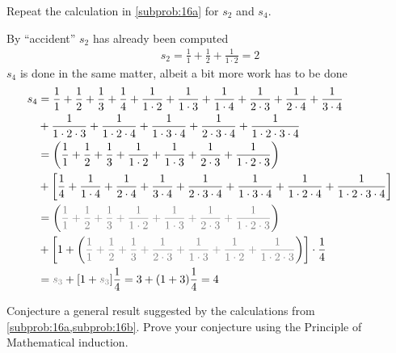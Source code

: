 \documentclass[a4paper, english, 12pt]{article} %
\begin{document}
\begin{subproblem}
    \label{subprob:16b}
  Repeat the calculation in \cref{subprob:16a} for $s_2$ and $s_4$.
\end{subproblem}

\begin{answer}
  By ``accident'' $s_2$ has already been computed
  \begin{align*}
    s_2 = \frac{1}{1} + \frac{1}{2} + \frac{1}{1 \cdot 2} = 2
  \end{align*}
  $s_4$ is done in the same matter, albeit a bit more work has to be done
  \begin{align*}
        s_4
    & = \frac{1}{1} + \frac{1}{2} + \frac{1}{3} + \frac{1}{4}
      + \frac{1}{1 \cdot 2} + \frac{1}{1 \cdot 3} + \frac{1}{1 \cdot 4} 
      + \frac{1}{2 \cdot 3} + \frac{1}{2 \cdot 4} + \frac{1}{3 \cdot 4} \\
    & + \frac{1}{1 \cdot 2 \cdot 3} + \frac{1}{1 \cdot 2 \cdot 4} + \frac{1}{1 \cdot 3 \cdot 4}
    + \frac{1}{2 \cdot 3 \cdot 4} + \frac{1}{1\cdot 2 \cdot 3 \cdot 4} \\
    & = \left(   \frac{1}{1} + \frac{1}{2} + \frac{1}{3}
      + \frac{1}{1\cdot 2} + \frac{1}{ 1 \cdot 3} + \frac{1}{2 \cdot 3} + \frac{1}{1 \cdot 2 \cdot 3} \right)\\
    & + \left[ \frac{1}{4}
      + \frac{1}{1\cdot 4} + \frac{1}{2 \cdot 4} + \frac{1}{3 \cdot 4} + \frac{1}{2 \cdot 3 \cdot 4} + \frac{1}{1 \cdot 3 \cdot 4} + \frac{1}{1 \cdot 2 \cdot 4} + \frac{1}{1 \cdot 2 \cdot 3 \cdot 4}\right] \\
    & = \left(   \textcolor{gray}{\frac{1}{1} + \frac{1}{2} + \frac{1}{3}
      + \frac{1}{1\cdot 2} + \frac{1}{ 1 \cdot 3} + \frac{1}{2 \cdot 3} + \frac{1}{1 \cdot 2 \cdot 3}} \right)\\
    & + \left[ 1 
      +  \left( \textcolor{gray}{\frac{1}{1} +  \frac{1}{2} + \frac{1}{3} + \frac{1}{2 \cdot 3} + \frac{1}{1 \cdot 3} + \frac{1}{1 \cdot 2} + \frac{1}{1 \cdot 2 \cdot 3}}\right)\right] \cdot \frac{1}{4} \\
    & = \textcolor{gray}{s_3} + [1 + \textcolor{gray}{s_3}]\frac{1}{4} = 3 + (1+3)\frac{1}{4} = 4 
  \end{align*}
\end{answer}

\begin{subproblem}
  Conjecture a general result suggested by the calculations from
  \cref{subprob:16a,subprob:16b}. Prove your conjecture using the Principle of
  Mathematical induction.
\end{subproblem}
\end{document}
